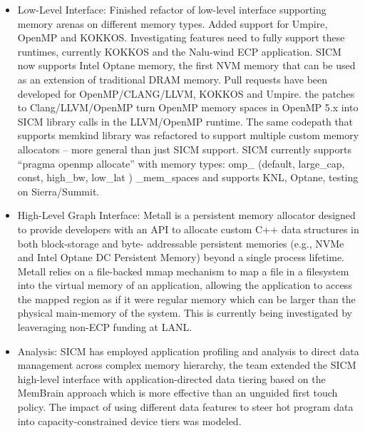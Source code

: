 \begin{itemize}
\item  Low-Level Interface: Finished refactor of low-level interface supporting memory arenas on different memory types. Added support for Umpire, OpenMP and KOKKOS. Investigating features need to fully support these runtimes, currently KOKKOS and the Nalu-wind ECP application. SICM now supports Intel Optane memory, the first NVM memory that can be used as an extension of traditional DRAM memory.
Pull requests have been developed for OpenMP/CLANG/LLVM, KOKKOS and Umpire. the patches to Clang/LLVM/OpenMP turn OpenMP memory spaces in OpenMP 5.x into SICM library calls in the LLVM/OpenMP runtime. The same codepath that supports memkind library was refactored to support multiple custom memory allocators – more general than just SICM support.
SICM currently supports ``pragma openmp allocate'' with  memory types: omp\_ (default, large\_cap, const, high\_bw, low\_lat ) \_mem\_spaces and supports KNL, Optane, testing on Sierra/Summit.
\item  High-Level Graph Interface: Metall is a persistent memory allocator designed to provide developers with an API to allocate custom C++ data structures in both block-storage and byte- addressable persistent memories (e.g., NVMe and Intel Optane DC Persistent Memory) beyond a single process lifetime. Metall relies on a file-backed mmap mechanism to map a file in a filesystem into the virtual memory of an application, allowing the application to access the mapped region as if it were regular memory which can be larger than the physical main-memory of the system. This is currently being investigated by leaveraging non-ECP funding at LANL.
\item Analysis: 
SICM has employed application profiling and analysis to direct data management across complex memory hierarchy, the team extended the SICM high-level interface with application-directed data tiering based on the MemBrain approach which is more effective than an unguided first touch policy.  The impact of using different data features to steer hot program data into capacity-constrained device tiers was modeled.
\end{itemize}
